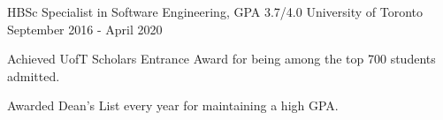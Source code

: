 

\begin{cventries}

  \cventry
    {HBSc Specialist in Software Engineering, GPA 3.7/4.0} %
    {University of Toronto} %
    {} %
    {September 2016 - April 2020} %
    {
      \begin{cvitems} %
        \item {Achieved UofT Scholars Entrance Award for being among the top 700 students admitted.}
        \item {Awarded Dean’s List every year for maintaining a high GPA.}
      \end{cvitems}
    }

\end{cventries}
